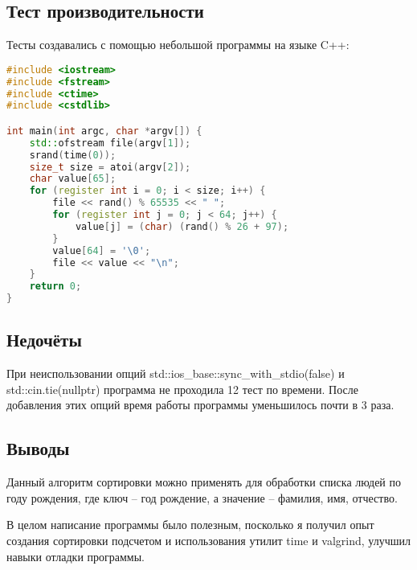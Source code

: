 \documentclass[12pt]{article}
\begin{document}
\subsection*{Тест производительности}

Тесты создавались с помощью небольшой программы на языке C++:
\begin{lstlisting}[language=C++]
#include <iostream>
#include <fstream>
#include <ctime>
#include <cstdlib>

int main(int argc, char *argv[]) {
	std::ofstream file(argv[1]);
	srand(time(0));
	size_t size = atoi(argv[2]);
	char value[65];
	for (register int i = 0; i < size; i++) {
		file << rand() % 65535 << " ";
		for (register int j = 0; j < 64; j++) {
			value[j] = (char) (rand() % 26 + 97);
		}
		value[64] = '\0';
		file << value << "\n";
	}
	return 0;
}
\end{lstlisting}


\subsection*{Недочёты}

При неиспользовании опций std::ios\_base::sync\_with\_stdio(false) и std::cin.tie(nullptr) программа не проходила 12 тест по времени. После добавления этих опций время работы программы уменьшилось почти в 3 раза.

\subsection*{Выводы}

Данный алгоритм сортировки можно применять для обработки списка людей по году рождения, где ключ -- год рождение, а значение -- фамилия, имя, отчество.

В целом написание программы было полезным, посколько я получил опыт создания сортировки подсчетом и использования утилит time и valgrind, улучшил навыки отладки программы. 
\end{document}
